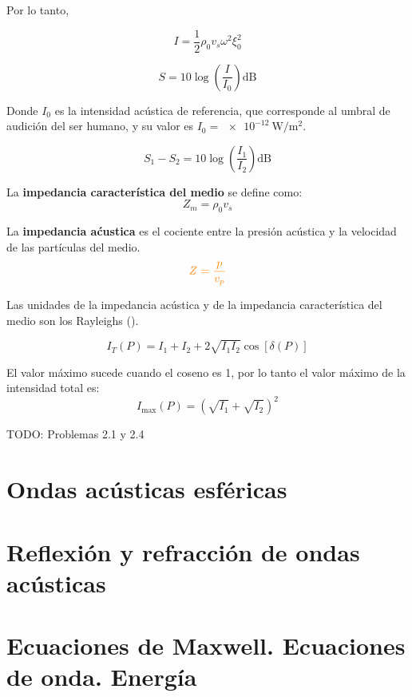 \documentclass[12pt, a4paper]{article}
\begin{document}
Por lo tanto,

\begin{equation} \label{eq:intensidad_onda_final}
    I = \frac{1}{2} \rho_0 v_s \omega ^2 \xi _0 ^2
\end{equation}

\[ S = 10 \log \left( \frac{I}{I_0}  \right) \unit{\dB}  \]

Donde $I_0$ es la intensidad acústica de referencia, que corresponde al umbral de audición del ser humano, y su valor es $I_0 = \qty{e-12}{\watt\per \meter\squared}$.

\[ S_1 - S_2 = 10 \log \left( \frac{I_1}{I_2} \right) \unit{\dB} \]

La \textbf{impedancia característica del medio} se define como:
\begin{equation} \label{eq:impedancia_caracteristica}
    Z_m = \rho_0 v_s
\end{equation}

La \textbf{impedancia aćustica} es el cociente entre la presión acústica y la velocidad de las partículas del medio.
\begin{equation} \label{eq:impedancia_acustica} \color{orange}
    Z = \frac{p}{v_p}
\end{equation}

Las unidades de la impedancia acústica y de la impedancia característica del medio son los Rayleighs (\unit{\rayl}).

\begin{equation} \label{eq:interferencias}
    I_T(P) = I_1 + I_2 + 2 \sqrt{I_1I_2}\cos \left[ \delta (P) \right]
\end{equation}

El valor máximo sucede cuando el coseno es 1, por lo tanto el valor máximo de la intensidad total es:
\[ I_{\text{max}}(P) = \left( \sqrt{I_1} + \sqrt{I_2} \right) ^2 \]

TODO: Problemas 2.1 y 2.4

\section{Ondas acústicas esféricas}
\section{Reflexión y refracción de ondas acústicas}
\section{Ecuaciones de Maxwell. Ecuaciones de onda. Energía}
\end{document}

